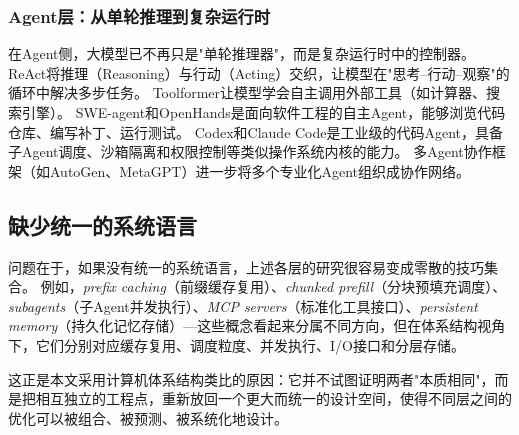 \subsubsection{Agent层：从单轮推理到复杂运行时}

在Agent侧，大模型已不再只是"单轮推理器"，而是复杂运行时中的控制器。
ReAct\cite{yao2023react}将推理（Reasoning）与行动（Acting）交织，让模型在"思考--行动--观察"的循环中解决多步任务。
Toolformer\cite{schick2023toolformer}让模型学会自主调用外部工具（如计算器、搜索引擎）。
SWE-agent\cite{sweagent2024}和OpenHands\cite{openhands_paper_2025}是面向软件工程的自主Agent，能够浏览代码仓库、编写补丁、运行测试。
Codex\cite{openai_codex_overview_2026}和Claude Code\cite{anthropic_claudecode_overview_2026}是工业级的代码Agent，具备子Agent调度\cite{openai_codex_subagents_2026,anthropic_claudecode_subagents_2026}、沙箱隔离\cite{openai_codex_sandbox_2026,anthropic_claudecode_sandbox_2026}和权限控制\cite{openai_codex_approvals_2026,anthropic_claudecode_security_2026}等类似操作系统内核的能力。
多Agent协作框架（如AutoGen\cite{wu2023autogen}、MetaGPT\cite{metagpt2023}）进一步将多个专业化Agent组织成协作网络。

\subsection{缺少统一的系统语言}

问题在于，如果没有统一的系统语言，上述各层的研究很容易变成零散的技巧集合。
例如，\emph{prefix caching}（前缀缓存复用）、\emph{chunked prefill}（分块预填充调度）、\emph{subagents}（子Agent并发执行）、\emph{MCP servers}（标准化工具接口）、\emph{persistent memory}（持久化记忆存储）---这些概念看起来分属不同方向，但在体系结构视角下，它们分别对应缓存复用、调度粒度、并发执行、I/O接口和分层存储。

这正是本文采用计算机体系结构类比的原因：它并不试图证明两者"本质相同"，而是把相互独立的工程点，重新放回一个更大而统一的设计空间，使得不同层之间的优化可以被组合、被预测、被系统化地设计。
